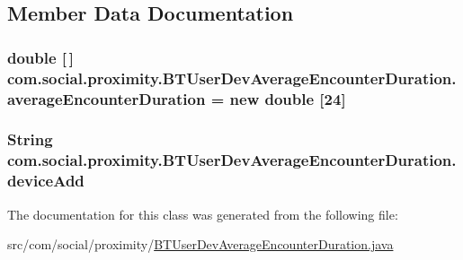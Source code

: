 \subsection{Member Data Documentation}
\hypertarget{classcom_1_1social_1_1proximity_1_1_b_t_user_dev_average_encounter_duration_a72d8edbf20fdcc400ea6093084b03887}{}
\subsubsection[{average\+Encounter\+Duration}]{\setlength{\rightskip}{0pt plus 5cm}double \mbox{[}$\,$\mbox{]} com.\+social.\+proximity.\+B\+T\+User\+Dev\+Average\+Encounter\+Duration.\+average\+Encounter\+Duration = new double \mbox{[}24\mbox{]}\hspace{0.3cm}{\ttfamily [private]}}\label{classcom_1_1social_1_1proximity_1_1_b_t_user_dev_average_encounter_duration_a72d8edbf20fdcc400ea6093084b03887}
\hypertarget{classcom_1_1social_1_1proximity_1_1_b_t_user_dev_average_encounter_duration_a7161e8fe284b7c496386bddab669b7a0}{}
\subsubsection[{device\+Add}]{\setlength{\rightskip}{0pt plus 5cm}String com.\+social.\+proximity.\+B\+T\+User\+Dev\+Average\+Encounter\+Duration.\+device\+Add\hspace{0.3cm}{\ttfamily [private]}}\label{classcom_1_1social_1_1proximity_1_1_b_t_user_dev_average_encounter_duration_a7161e8fe284b7c496386bddab669b7a0}


The documentation for this class was generated from the following file\+:\begin{DoxyCompactItemize}
\item 
src/com/social/proximity/\hyperlink{_b_t_user_dev_average_encounter_duration_8java}{B\+T\+User\+Dev\+Average\+Encounter\+Duration.\+java}\end{DoxyCompactItemize}
